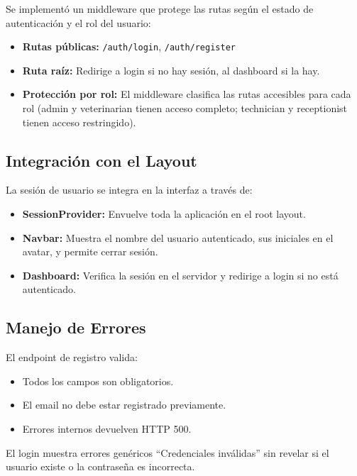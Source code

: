 \documentclass[12pt,a4paper]{article}
\begin{document}
Se implementó un middleware que protege las rutas según el estado de
autenticación y el rol del usuario:

\begin{itemize}[leftmargin=*]
    \item \textbf{Rutas públicas:} \texttt{/auth/login}, \texttt{/auth/register}
    \item \textbf{Ruta raíz:} Redirige a login si no hay sesión, al dashboard
          si la hay.
    \item \textbf{Protección por rol:} El middleware clasifica las rutas
          accesibles para cada rol (admin y veterinarian tienen acceso completo;
          technician y receptionist tienen acceso restringido).
\end{itemize}

\subsection{Integración con el Layout}

La sesión de usuario se integra en la interfaz a través de:

\begin{itemize}[leftmargin=*]
    \item \textbf{SessionProvider:} Envuelve toda la aplicación en el root layout.
    \item \textbf{Navbar:} Muestra el nombre del usuario autenticado, sus
          iniciales en el avatar, y permite cerrar sesión.
    \item \textbf{Dashboard:} Verifica la sesión en el servidor y redirige
          a login si no está autenticado.
\end{itemize}

\subsection{Manejo de Errores}

El endpoint de registro valida:

\begin{itemize}[leftmargin=*]
    \item Todos los campos son obligatorios.
    \item El email no debe estar registrado previamente.
    \item Errores internos devuelven HTTP 500.
\end{itemize}

El login muestra errores genéricos ``Credenciales inválidas'' sin revelar
si el usuario existe o la contraseña es incorrecta.
\end{document}
